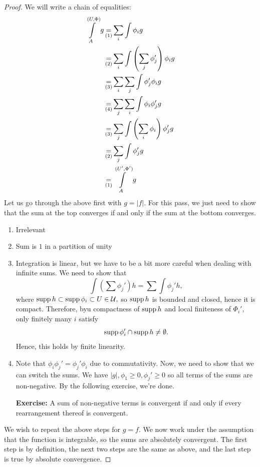 \documentclass{article}
\numberwithin{equation}{section}
\begin{document}
\begin{proof}
    We will write a chain of equalities:
    \begin{align}
        \int^{(U,\Phi)}\limits_{A} g &\operatorname*{=}_{(1)} \sum_{i}\int \phi_i g \\ 
        &\operatorname*{=}_{(2)} \sum_{i}\int \left(\sum_j \phi_j' \right)\phi_i g \\
        &\operatorname*{=}_{(3)} \sum_i \sum_j \int \phi_j'\phi_i g \\
        &\operatorname*{=}_{(4)} \sum_j \sum_i \int \phi_i\phi_j' g \\
        &\operatorname*{=}_{(3)} \sum_j \int \left(\sum_i \phi_i\right)\phi_j' g \\
        &\operatorname*{=}_{(2)} \sum_j \int \phi_j' g \\
        &\operatorname*{=}_{(1)} \int^{(U', \Phi')}\limits_{A} g
    \end{align}
    Let us go through the above first with $g=|f|$. For this pass, we just need to show that the sum at the top converges if and only if the sum at the bottom converges.
    \begin{enumerate}
        \item Irrelevant
        \item Sum is $1$ in a partition of unity
        \item Integration is linear, but we have to be a bit more careful when dealing with infinite sums. We need to show that
        \begin{equation}
            \int \left(\sum \phi_j'\right) h  = \sum \int \phi_j' h,
        \end{equation}
        where $\operatorname{supp} h \subset \operatorname{supp} \phi_i \subset U \in \mathcal{U},$ so $\operatorname{supp} h$ is bounded and closed, hence it is compact. Therefore, byu compactness of $\operatorname{supp} h$ and local finiteness of $\Phi_i'$, only finitely many $i$ satisfy
        \begin{equation}
            \operatorname{supp} \phi_i' \cap \operatorname{supp} h \neq \emptyset.
        \end{equation}
        Hence, this holds by finite linearity.
        \item Note that $\phi_i\phi_j' = \phi_j'\phi_i$ due to commutativity. Now, we need to show that we can switch the sums. We have $|g|, \phi_1 \ge 0, \phi_j' \ge 0$ so all terms of the sums are non-negative. By the following exercise, we're done.
        
        \textbf{Exercise:} A sum of non-negative terms is convergent if and only if every rearrangement thereof is convergent.
    \end{enumerate}

    We wish to repeat the above steps for $g=f$. We now work under the assumption that the function is integrable, so the sums are absolutely convergent. The first step is by definition, the next two steps are the same as above, and the last step is true by absolute convergence.
\end{proof}
\end{document}
